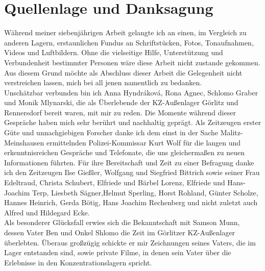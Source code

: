 %
\section*{Quellenlage und Danksagung}
Während meiner siebenjährigen Arbeit gelangte ich an einen, im Vergleich zu anderen Lagern, erstaunlichen Fundus an Schriftstücken, Fotos, Tonaufnahmen, Videos und Luftbildern. Ohne die vielseitige Hilfe, Unterstützung und Verbundenheit bestimmter Personen wäre diese Arbeit nicht zustande gekommen. Aus diesem Grund möchte als Abschluss dieser Arbeit die Gelegenheit nicht verstreichen lassen, mich bei all jenen namentlich zu bedanken.
\\
Unschätzbar verbunden bin ich Anna Hyndr\'akov\'a, Rona Agnec, Schlomo Graber und Monik Mlynarski, die als Überlebende der KZ-Außenlager Görlitz und Rennersdorf bereit waren, mit mir zu reden. Die Momente während dieser Gespräche haben mich sehr berührt und nachhaltig geprägt. Als Zeitzeugen erster Güte und unnachgiebigen Forscher danke ich dem einst in der Sache Malitz-Meinshausen ermittelnden Polizei-Kommissar Kurt Wolf für die langen und erkenntnisreichen Gespräche und Telefonate, die uns gleichermaßen zu neuen Informationen führten.
Für ihre Bereitschaft und Zeit zu einer Befragung danke ich den Zeitzeugen Ilse Gießler, Wolfgang und Siegfried Bittrich sowie seiner Frau Edeltraud, Christa Schubert, Elfriede und Bärbel Lorenz, Elfriede und Hans-Joachim Terp, Liesbeth Sägner,Helmut Sperling, Horst Rohland, Günter Scholze, Hannes Heinrich, Gerda Bötig, Hans Joachim Rechenberg und nicht zuletzt auch Alfred und Hildegard Ecke.
\\
Als besonderer Glücksfall erwies sich die Bekanntschaft mit Samson Munn, dessen Vater Ben und Onkel Shlomo die Zeit im Görlitzer KZ-Außenlager überlebten. Überaus großzügig schickte er mir Zeichnungen seines Vaters, die im Lager entstanden sind, sowie private Filme, in denen sein Vater über die Erlebnisse in den Konzentrationslagern spricht.
